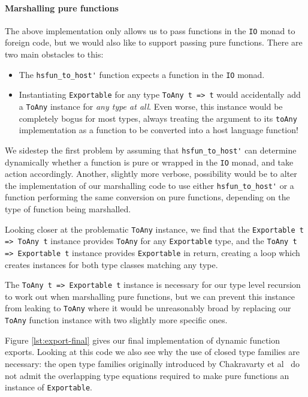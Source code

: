 \documentclass[preprint]{sigplanconf}
\begin{document}
\paragraph{Marshalling pure functions}
The above implementation only allows us to pass functions in the \lstinline!IO!
monad to foreign code, but we would also like to support passing pure
functions. There are two main obstacles to this:

\begin{itemize}
\item
  The \lstinline!hsfun_to_host'! function expects a function in the
  \lstinline!IO! monad.
\item
  Instantiating \lstinline!Exportable! for any type \lstinline!ToAny t => t!
  would accidentally add a \lstinline!ToAny! instance for
  \emph{any type at all}.
  Even worse, this instance would be completely bogus for most types,
  always treating
  the argument to its \lstinline!toAny! implementation as a function to be
  converted into a host language function!
\end{itemize}

We sidestep the first problem by assuming that \lstinline!hsfun_to_host'!
can determine dynamically whether a function is pure or wrapped in the
\lstinline!IO! monad, and take action accordingly.
Another, slightly more verbose, possibility would be to alter the
implementation of our marshalling code to use either
\lstinline!hsfun_to_host'! or a function performing the same conversion
on pure functions, depending on the type of function being marshalled.

Looking closer at the problematic \lstinline!ToAny! instance, we find that
the \lstinline!Exportable t => ToAny t! instance provides
\lstinline!ToAny! for any \lstinline!Exportable! type, and the
\lstinline!ToAny t => Exportable t! instance provides \lstinline!Exportable! in
return, creating a loop which creates instances for both type classes
matching any type.

The \lstinline!ToAny t => Exportable t! instance is necessary
for our type level recursion to work out when marshalling pure functions,
but we can prevent this instance from leaking to \lstinline!ToAny! where it
would be unreasonably broad by replacing our \lstinline!ToAny! function
instance with two slightly more specific ones.

Figure \ref{lst:export-final} gives our final implementation of dynamic
function exports.
Looking at this code we also see why the use of closed type families are
necessary: the open type families originally introduced by Chakravarty et
al\ \cite{typefamilies} do not admit the overlapping type equations required
to make pure functions an instance of \lstinline!Exportable!.
\end{document}
